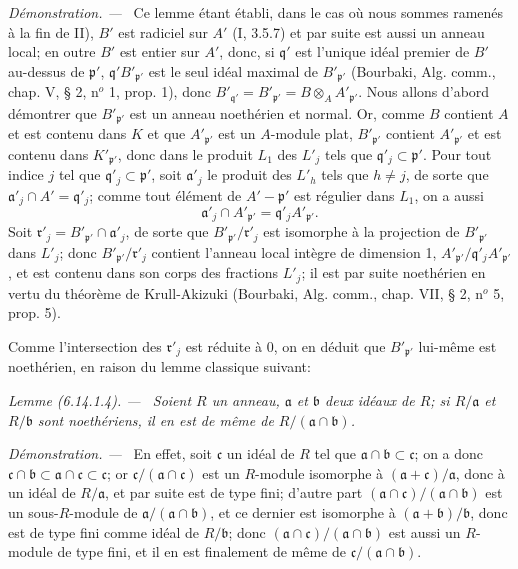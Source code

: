 \documentclass[10pt,oneside]{book}
\newcommand{\oldpage}[2][]{%
  \setcounter{footnote}{0}%
  \marginpar{\scriptsize\textbf{#1}~|~#2}\ignorespaces}
\newenvironment{lemma}[1][]{%
  \par\medskip\noindent\itshape Lemme (#1). ---\ }{\par}
\newenvironment{proof}{%
  \par\medskip\noindent\textit{Démonstration. ---\ }}{\par}
\begin{document}
\begin{proof}
Ce lemme étant établi, dans le cas où nous sommes ramenés à la fin de II),
$B'$ est radiciel sur $A'$ (I, 3.5.7) et par suite est aussi un anneau
local; en outre $B'$ est entier sur $A'$, donc, si $\mathfrak q'$ est
l'unique idéal premier de $B'$ au-dessus de $\mathfrak p'$,
$\mathfrak q'B'_{\mathfrak p'}$ est le seul idéal maximal de
$B'_{\mathfrak p'}$ (Bourbaki, Alg. comm., chap. V, § 2, n$^o$ 1, prop.
1), donc $B'_{\mathfrak q'}=B'_{\mathfrak p'}=B\otimes_A
A'_{\mathfrak p'}$. Nous allons d'abord démontrer que
$B'_{\mathfrak p'}$ est un anneau noethérien et normal. Or, comme $B$
contient $A$ et est contenu dans $K$ et que $A'_{\mathfrak p'}$ est un
$A$-module plat, $B'_{\mathfrak p'}$ contient $A'_{\mathfrak p'}$ et est
contenu dans $K'_{\mathfrak p'}$, donc dans le produit $L_1$ des $L'_j$
tels que $\mathfrak q'_j\subset\mathfrak p'$. Pour tout indice $j$ tel que
$\mathfrak q'_j\subset\mathfrak p'$, soit $\mathfrak a'_j$ le produit des
$L'_h$ tels que $h\neq j$, de sorte que
$\mathfrak a'_j\cap A'=\mathfrak q'_j$; comme tout élément de
$A'-\mathfrak p'$ est régulier dans $L_1$, on a aussi
\[
\mathfrak a'_j\cap A'_{\mathfrak p'}=
\mathfrak q'_jA'_{\mathfrak p'}.
\]
Soit $\mathfrak r'_j=B'_{\mathfrak p'}\cap\mathfrak a'_j$, de sorte que
$B'_{\mathfrak p'}/\mathfrak r'_j$ est isomorphe à la projection de
$B'_{\mathfrak p'}$ dans $L'_j$; donc $B'_{\mathfrak p'}/\mathfrak r'_j$
contient l'anneau local intègre de dimension 1,
$A'_{\mathfrak p'}/\mathfrak q'_jA'_{\mathfrak p'}$, et est contenu dans
son corps des fractions $L'_j$; il est par suite noethérien en vertu du
théorème de Krull-Akizuki (Bourbaki, Alg. comm., chap. VII, § 2, n$^o$ 5,
prop. 5).

\oldpage[IV-2]{173}
Comme l'intersection des $\mathfrak r'_j$ est réduite à 0, on en déduit que
$B'_{\mathfrak p'}$ lui-même est noethérien, en raison du lemme classique
suivant:

\begin{lemma}[6.14.1.4]
\label{IV.2.s6.14.1.4-fr}
Soient $R$ un anneau, $\mathfrak a$ et $\mathfrak b$ deux idéaux de $R$; si
$R/\mathfrak a$ et $R/\mathfrak b$ sont noethériens, il en est de même de
$R/(\mathfrak a\cap\mathfrak b)$.
\end{lemma}

\begin{proof}
En effet, soit $\mathfrak c$ un idéal de $R$ tel que
$\mathfrak a\cap\mathfrak b\subset\mathfrak c$; on a donc
$\mathfrak c\cap\mathfrak b\subset\mathfrak a\cap\mathfrak c\subset
\mathfrak c$; or $\mathfrak c/(\mathfrak a\cap\mathfrak c)$ est un
$R$-module isomorphe à $(\mathfrak a+\mathfrak c)/\mathfrak a$, donc à un
idéal de $R/\mathfrak a$, et par suite est de type fini; d'autre part
$(\mathfrak a\cap\mathfrak c)/(\mathfrak a\cap\mathfrak b)$ est un
sous-$R$-module de $\mathfrak a/(\mathfrak a\cap\mathfrak b)$, et ce
dernier est isomorphe à $(\mathfrak a+\mathfrak b)/\mathfrak b$, donc est
de type fini comme idéal de $R/\mathfrak b$; donc
$(\mathfrak a\cap\mathfrak c)/(\mathfrak a\cap\mathfrak b)$ est aussi un
$R$-module de type fini, et il en est finalement de même de
$\mathfrak c/(\mathfrak a\cap\mathfrak b)$.
\end{proof}


\end{proof}
\end{document}
